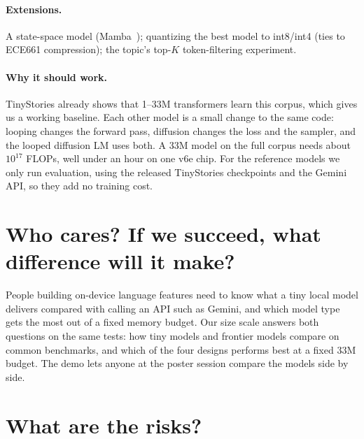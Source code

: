\documentclass[11pt]{article}
\begin{document}
\paragraph{Extensions.} A state-space model (Mamba~\cite{mamba}); quantizing the best model to int8/int4 (ties to ECE661 compression); the topic's top-$K$ token-filtering experiment.

\paragraph{Why it should work.} TinyStories already shows that 1--33M transformers learn this corpus, which gives us a working baseline. Each other model is a small change to the same code: looping changes the forward pass, diffusion changes the loss and the sampler, and the looped diffusion LM uses both. A 33M model on the full corpus needs about $10^{17}$ FLOPs, well under an hour on one v6e chip. For the reference models we only run evaluation, using the released TinyStories checkpoints and the Gemini API, so they add no training cost.

\section{Who cares? If we succeed, what difference will it make?}

People building on-device language features need to know what a tiny local model delivers compared with calling an API such as Gemini, and which model type gets the most out of a fixed memory budget. Our size scale answers both questions on the same tests: how tiny models and frontier models compare on common benchmarks, and which of the four designs performs best at a fixed 33M budget. The demo lets anyone at the poster session compare the models side by side.

\section{What are the risks?}
\end{document}

